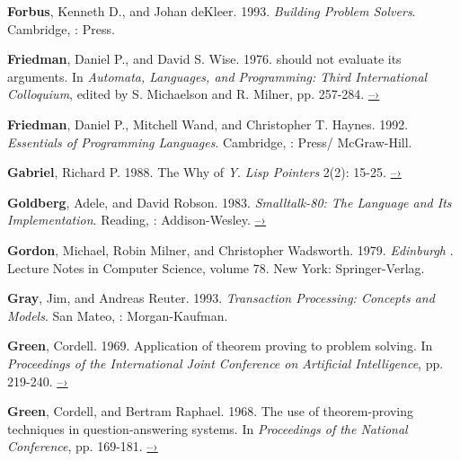  \label{Forbus and deKleer 1993}
\textbf{Forbus}, Kenneth D., and Johan deKleer.  1993. \textit{Building Problem
Solvers}. Cambridge, :  Press.

 \label{Friedman and Wise (1976)}
\textbf{Friedman}, Daniel P., and David S. Wise.  1976.   should not
evaluate its arguments. In \textit{Automata, Languages, and Programming: Third
International Colloquium}, edited by S. Michaelson and R.  Milner, pp. 257-284.
\href{https://www.cs.indiana.edu/cgi-bin/techreports/TRNNN.cgi?trnum=TR44}{–›}

 \label{Friedman et al. 1992}
\textbf{Friedman}, Daniel P., Mitchell Wand, and Christopher T. Haynes. 1992.
\textit{Essentials of Programming Languages}.  Cambridge, : 
Press/ McGraw-Hill.

 \label{Gabriel 1988}
\textbf{Gabriel}, Richard P. 1988.  The Why of \emph{Y}.  \textit{Lisp Pointers}
2(2): 15-25.
\href{http://www.dreamsongs.com/Files/WhyOfY.pdf}{–›}

\textbf{Goldberg}, Adele, and David Robson.  1983.  \textit{Smalltalk-80: The Language and
Its Implementation}. Reading, : Addison-Wesley.
\href{http://stephane.ducasse.free.fr/FreeBooks/BlueBook/Bluebook.pdf}{–›}

 \label{Gordon et al. 1979}
\textbf{Gordon}, Michael, Robin Milner, and Christopher Wadsworth.  1979.
\textit{Edinburgh }. Lecture Notes in Computer Science, volume 78. New York:
Springer-Verlag.

 \label{Gray and Reuter 1993}
\textbf{Gray}, Jim, and Andreas Reuter. 1993. \textit{Transaction Processing: Concepts and
Models}. San Mateo, : Morgan-Kaufman.

 \label{Green 1969}
\textbf{Green}, Cordell.  1969.  Application of theorem proving to problem solving.  In
\textit{Proceedings of the International Joint Conference on Artificial
Intelligence}, pp. 219-240.
\href{http://citeseer.ist.psu.edu/viewdoc/summary?doi=10.1.1.81.9820}{–›}

 \label{Green and Raphael (1968)}
\textbf{Green}, Cordell, and Bertram Raphael.  1968.  The use of theorem-proving
techniques in question-answering systems.  In \textit{Proceedings of the
 National Conference}, pp. 169-181.
\href{http://www.kestrel.edu/home/people/green/publications/green-raphael.pdf}{–›}

